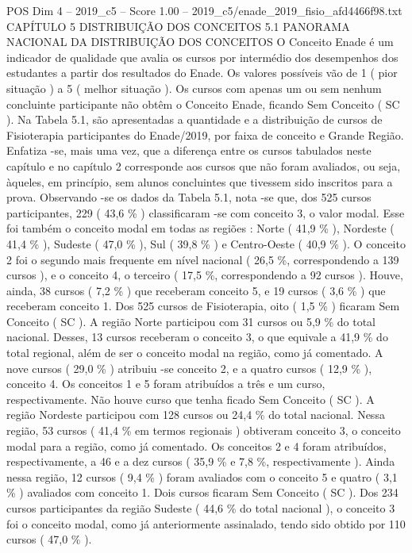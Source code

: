 \begin{textsample}{POS Dim 4 – 2019\_c5 – Score 1.00 – 2019\_c5/enade\_2019\_fisio\_afd4466f98.txt}  \label{ex:f4_pos_191}
CAPÍTULO 5 DISTRIBUIÇÃO DOS CONCEITOS 5.1 PANORAMA NACIONAL DA DISTRIBUIÇÃO DOS CONCEITOS O Conceito Enade é um indicador de qualidade que avalia os cursos por intermédio dos desempenhos dos estudantes a partir dos resultados do Enade.
Os valores possíveis vão de 1 ( pior situação ) a 5 ( melhor situação ).
Os cursos com apenas um ou sem nenhum concluinte participante não obtêm o Conceito Enade, ficando Sem Conceito ( SC ).
Na Tabela 5.1, são apresentadas a quantidade e a distribuição de cursos de Fisioterapia participantes do Enade/2019, por faixa de conceito e Grande Região.
Enfatiza -se, mais uma vez, que a diferença entre os cursos tabulados neste capítulo e no capítulo 2 corresponde aos cursos que não foram avaliados, ou seja, àqueles, em princípio, sem alunos concluintes que tivessem sido inscritos para a prova.
Observando -se os dados da Tabela 5.1, nota -se que, dos 525 cursos participantes, 229 ( 43,6 \% ) classificaram -se com conceito 3, o valor modal.
Esse foi também o conceito modal em todas as regiões : Norte ( 41,9 \% ), Nordeste ( 41,4 \% ), Sudeste ( 47,0 \% ), Sul ( 39,8 \% ) e Centro-Oeste ( 40,9 \% ).
O conceito 2 foi o segundo mais frequente em nível nacional ( 26,5 \%, correspondendo a 139 cursos ), e o conceito 4, o terceiro ( 17,5 \%, correspondendo a 92 cursos ).
Houve, ainda, 38 cursos ( 7,2 \% ) que receberam conceito 5, e 19 cursos ( 3,6 \% ) que receberam conceito 1.
Dos 525 cursos de Fisioterapia, oito ( 1,5 \% ) ficaram Sem Conceito ( SC ).
A região Norte participou com 31 cursos ou 5,9 \% do total nacional.
Desses, 13 cursos receberam o conceito 3, o que equivale a 41,9 \% do total regional, além de ser o conceito modal na região, como já comentado.
A nove cursos ( 29,0 \% ) atribuiu -se conceito 2, e a quatro cursos ( 12,9 \% ), conceito 4.
Os conceitos 1 e 5 foram atribuídos a três e um curso, respectivamente.
Não houve curso que tenha ficado Sem Conceito ( SC ).
A região Nordeste participou com 128 cursos ou 24,4 \% do total nacional.
Nessa região, 53 cursos ( 41,4 \% em termos regionais ) obtiveram conceito 3, o conceito modal para a região, como já comentado.
Os conceitos 2 e 4 foram atribuídos, respectivamente, a 46 e a dez cursos ( 35,9 \% e 7,8 \%, respectivamente ).
Ainda nessa região, 12 cursos ( 9,4 \% ) foram avaliados com o conceito 5 e quatro ( 3,1 \% ) avaliados com conceito 1.
Dois cursos ficaram Sem Conceito ( SC ).
Dos 234 cursos participantes da região Sudeste ( 44,6 \% do total nacional ), o conceito 3 foi o conceito modal, como já anteriormente assinalado, tendo sido obtido por 110 cursos ( 47,0 \% ).

\end{textsample}
